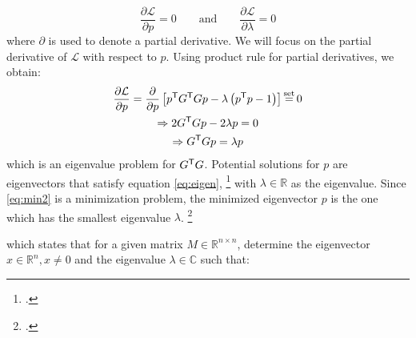 \begin{equation*}
    \frac{\partial \mathcal{L}}{\partial p} = 0 \qquad \text{and} \qquad \frac{\partial \mathcal{L}}{\partial \lambda} = 0
\end{equation*}
where $\partial$ is used to denote a partial derivative. We will focus on the partial derivative of $\mathcal{L}$ with respect to $p$. Using product rule for partial derivatives, we obtain:
\begin{gather}
    \frac{\partial \mathcal{L}}{\partial p} = \frac{\partial}{\partial p} \left[ p^\T G^\T Gp - \lambda \left( p^\T p - 1 \right) \right] \seteq 0 \nonumber \\
    \Rightarrow 2G^\T Gp - 2 \lambda p = 0 \nonumber \\
    \Rightarrow G^\T Gp = \lambda p \label{eq:eigen}
\end{gather}
which is an eigenvalue problem for $G^{\mathsf{T}} G$. Potential solutions for $p$ are eigenvectors that satisfy equation \ref{eq:eigen}, \footcite[][]{nayarLinearCamera2021} with $\lambda \in \mathbb{R}$ as the eigenvalue. Since \ref{eq:min2} is a minimization problem, the minimized eigenvector $p$ is the one which has the smallest eigenvalue $\lambda$. \footcite[][2]{ghojoghEigenvalueGeneralized2023}

which states that for a given matrix $M \in \mathbb{R}^{n \times n}$, determine the eigenvector $x \in \mathbb{R}^n, x \neq 0$ and the eigenvalue $\lambda \in \mathbb{C}$ such that:



